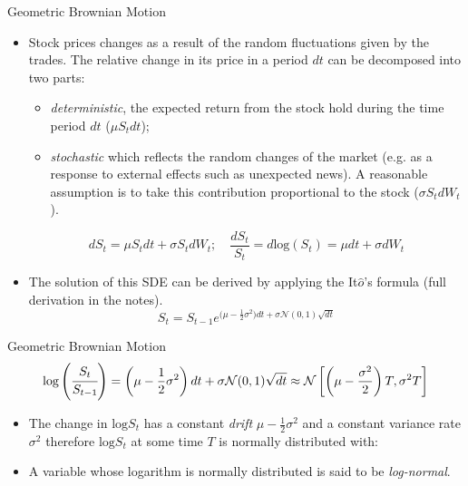 \documentclass{beamer}
\begin{document}
\begin{frame}{Geometric Brownian Motion}
\begin{itemize}
\item Stock prices changes as a result of the random fluctuations given by the trades. The relative change in its price in a period $dt$ can be decomposed into two parts:
\begin{itemize}
    \item \emph{deterministic}, the expected return from the stock hold during the time period $dt$ ($\mu S_tdt$);
    \item \emph{stochastic} which reflects the random changes of the market (e.g. as a response to external effects such as unexpected news). A reasonable assumption is to take this contribution proportional to the stock ($\sigma S_t dW_t$).
\end{itemize}
\begin{equation*}
dS_t = \mu S_tdt + \sigma S_tdW_t;\quad\frac{dS_t}{S_t} = d\textrm{log}(S_t) = \mu dt + \sigma dW_t 
\end{equation*}
\item The solution of this SDE can be derived by applying the It$\hat{o}$'s formula (full derivation in the notes).
\begin{equation*}
S_t = S_{t-1}e^{\big(\mu - \frac{1}{2}\sigma^2\big)dt + \sigma \mathcal{N}(0,1)\sqrt{dt}}
\end{equation*}
\end{itemize}
\end{frame}

\begin{frame}{Geometric Brownian Motion}
\begin{equation*}
	\textrm{log}\left(\cfrac{S_t}{S_{t-1}}\right) = \left(\mu - \frac{1}{2}\sigma^2\right)dt + \sigma \mathcal{N}(0,1)\sqrt{dt} \approx\mathcal{N}\left[\left(\mu-\frac{\sigma^2}{2}\right)T, \sigma^2 T\right]
\end{equation*}
\begin{itemize}
\item  The change in $\textrm{log} S_t$ has a constant \emph{drift} $\mu - \frac{1}{2}\sigma^2$ and a constant variance rate $\sigma^2$ therefore $\textrm{log} S_t$ at some time $T$ is normally distributed with:
\item A variable whose logarithm is normally distributed is said to be \emph{log-normal}.
\end{itemize}
\end{frame}
\end{document}
